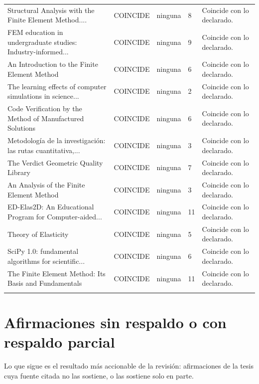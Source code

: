\documentclass[11pt,a4paper]{article}
\begin{document}
\begin{longtable}{@{}p{4.6cm}p{2.1cm}p{1.5cm}p{1.3cm}p{5.4cm}@{}}
Structural Analysis with the Finite Element Method.... & COINCIDE & ninguna & 8 & Coincide con lo declarado. \\ \addlinespace[2pt]
FEM education in undergraduate studies: Industry-informed... & COINCIDE & ninguna & 9 & Coincide con lo declarado. \\ \addlinespace[2pt]
An Introduction to the Finite Element Method & COINCIDE & ninguna & 6 & Coincide con lo declarado. \\ \addlinespace[2pt]
The learning effects of computer simulations in science... & COINCIDE & ninguna & 2 & Coincide con lo declarado. \\ \addlinespace[2pt]
Code Verification by the Method of Manufactured Solutions & COINCIDE & ninguna & 6 & Coincide con lo declarado. \\ \addlinespace[2pt]
Metodología de la investigación: las rutas cuantitativa,... & COINCIDE & ninguna & 3 & Coincide con lo declarado. \\ \addlinespace[2pt]
The Verdict Geometric Quality Library & COINCIDE & ninguna & 7 & Coincide con lo declarado. \\ \addlinespace[2pt]
An Analysis of the Finite Element Method & COINCIDE & ninguna & 3 & Coincide con lo declarado. \\ \addlinespace[2pt]
ED-Elas2D: An Educational Program for Computer-aided... & COINCIDE & ninguna & 11 & Coincide con lo declarado. \\ \addlinespace[2pt]
Theory of Elasticity & COINCIDE & ninguna & 5 & Coincide con lo declarado. \\ \addlinespace[2pt]
SciPy 1.0: fundamental algorithms for scientific... & COINCIDE & ninguna & 6 & Coincide con lo declarado. \\ \addlinespace[2pt]
The Finite Element Method: Its Basis and Fundamentals & COINCIDE & ninguna & 11 & Coincide con lo declarado. \\ \addlinespace[2pt]
\bottomrule\end{longtable}
\section{Afirmaciones sin respaldo o con respaldo parcial}
\noindent\small Lo que sigue es el resultado más accionable de la revisión: afirmaciones de la tesis cuya fuente citada no las sostiene, o las sostiene solo en parte.\par\vspace{6pt}
\end{document}
